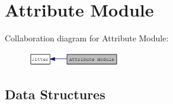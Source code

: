 \hypertarget{group__attrmod}{
\section{Attribute Module}
\label{group__attrmod}
}


Collaboration diagram for Attribute Module:\nopagebreak
\begin{figure}[H]
\begin{center}
\leavevmode
\includegraphics[width=114pt]{group__attrmod}
\end{center}
\end{figure}
\subsection*{Data Structures}
